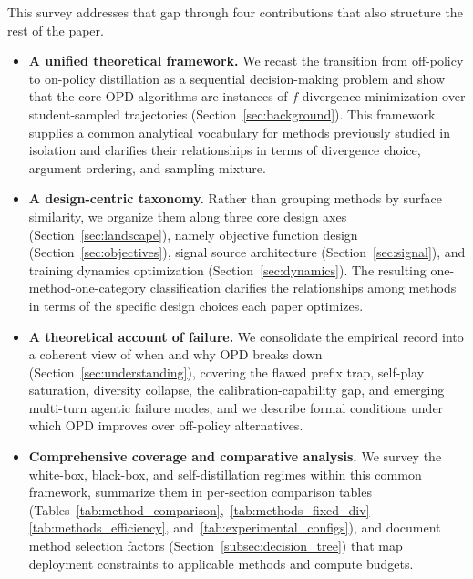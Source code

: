 \documentclass{article} %
\begin{document}
This survey addresses that gap through four contributions that also structure the rest of the paper.
\begin{itemize}[leftmargin=1.5em]
    \item \textbf{A unified theoretical framework.} We recast the transition from off-policy to on-policy distillation as a sequential decision-making problem and show that the core OPD algorithms are instances of $f$-divergence minimization over student-sampled trajectories (Section~\ref{sec:background}). This framework supplies a common analytical vocabulary for methods previously studied in isolation and clarifies their relationships in terms of divergence choice, argument ordering, and sampling mixture.
    \item \textbf{A design-centric taxonomy.} Rather than grouping methods by surface similarity, we organize them along three core design axes (Section~\ref{sec:landscape}), namely objective function design (Section~\ref{sec:objectives}), signal source architecture (Section~\ref{sec:signal}), and training dynamics optimization (Section~\ref{sec:dynamics}). The resulting one-method-one-category classification clarifies the relationships among methods in terms of the specific design choices each paper optimizes.
    \item \textbf{A theoretical account of failure.} We consolidate the empirical record into a coherent view of when and why OPD breaks down (Section~\ref{sec:understanding}), covering the flawed prefix trap, self-play saturation, diversity collapse, the calibration-capability gap, and emerging multi-turn agentic failure modes, and we describe formal conditions under which OPD improves over off-policy alternatives.
    \item \textbf{Comprehensive coverage and comparative analysis.} We survey the white-box, black-box, and self-distillation regimes within this common framework, summarize them in per-section comparison tables (Tables~\ref{tab:method_comparison},~\ref{tab:methods_fixed_div}--\ref{tab:methods_efficiency}, and~\ref{tab:experimental_configs}), and document method selection factors (Section~\ref{subsec:decision_tree}) that map deployment constraints to applicable methods and compute budgets.
\end{itemize}
\end{document}

